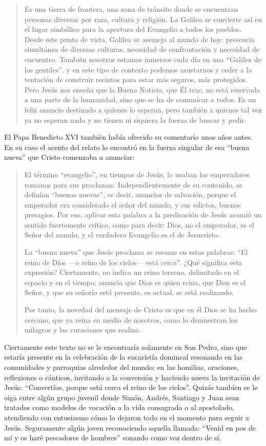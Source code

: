 \blockquote[{\cite{francisco2014angelus}}]{Es una tierra de frontera, una zona
  de tránsito donde se encuentran personas diversas por raza, cultura y
  religión. La Galilea se convierte así en el lugar simbólico para la apertura
  del Evangelio a todos los pueblos. Desde este punto de vista, Galilea se
  asemeja al mundo de hoy: presencia simultánea de diversas culturas, necesidad
  de confrontación y necesidad de encuentro. También nosotros estamos inmersos
  cada día en una \enquote{Galilea de los gentiles}, y en este tipo de contexto
  podemos asustarnos y ceder a la tentación de construir recintos para estar más
  seguros, más protegidos. Pero Jesús nos enseña que la Buena Noticia, que Él
  trae, no está reservada a una parte de la humanidad, sino que se ha de
  comunicar a todos. Es un feliz anuncio destinado a quienes lo esperan, pero
  también a quienes tal vez ya no esperan nada y no tienen ni siquiera la fuerza
  de buscar y pedir.}

El Papa Benedicto XVI también había ofrecido su comentario unos años antes. En
su caso el acento del relato lo encontró en la fuerza singular de esa
\enquote{buena nueva} que Cristo comenzaba a anunciar:

\blockquote[{\cite{benedicto2008angelus}}]{El término \enquote{evangelio}, en
  tiempos de Jesús, lo usaban los emperadores romanos para sus proclamas.
  Independientemente de su contenido, se definían \enquote{buenas nuevas}, es
  decir, anuncios de salvación, porque el emperador era considerado el señor del
  mundo, y sus edictos, buenos presagios. Por eso, aplicar esta
  palabra a la predicación de Jesús asumió un sentido fuertemente crítico, como
  para decir: Dios, no el emperador, es el Señor del mundo, y el verdadero
  Evangelio es el de Jesucristo.

  La \enquote{buena nueva} que Jesús proclama se resume en estas palabras:
  \enquote{El reino de Dios ---o reino de los cielos--- está cerca}. ¿Qué
  significa esta expresión? Ciertamente, no indica un reino terreno, delimitado
  en el espacio y en el tiempo; anuncia que Dios es quien reina, que Dios es el
  Señor, y que su señorío está presente, es actual, se está realizando.

  Por tanto, la novedad del mensaje de Cristo es que en él Dios se ha hecho
  cercano, que ya reina en medio de nosotros, como lo demuestran los milagros y
  las curaciones que realiza.}

Ciertamente este texto no se le encontraría solamente en San Pedro, sino que
estaría presente en la celebración de la eucaristía domincal resonando en las
comunidades y parroquias alrededor del mundo; en las homilias, oraciones,
reflexiones o cánticos, invitando a la conversión y haciendo nueva la invitación
de Jesús: \enquote{Convertíos, porque está cerca el reino de los cielos}. Quizás
tambíen se le oiga entre algún grupo juvenil donde Simón, Andrés, Santiago y
Juan sean tratados como modelos de vocación a la vida consagrada o al
apostolado, atendiendo con entusiasmo cómo lo dejaron todo en el momento para
seguir a Jesús. Seguramente algún joven reconociendo aquella llamada:
\enquote{Venid en pos de mí y os haré pescadores de hombres} sonando como voz
dentro de sí.

